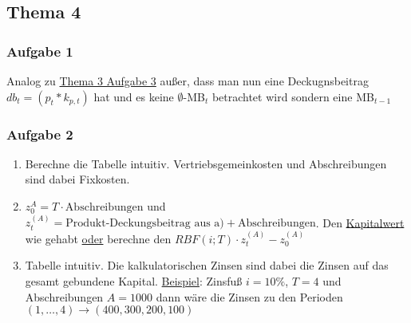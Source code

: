 \documentclass[12pt]{article}
\begin{document}
		\subsection*{Thema 4}
		\subsubsection*{Aufgabe 1}
		Analog zu \hyperref[Thema3Aufgabe3]{Thema 3 Aufgabe 3} außer, dass man nun eine Deckugnsbeitrag $db_t=(p_t*k_{p,t})$ hat und es keine $\emptyset$-MB$_t$ betrachtet wird sondern eine MB$_{t-1}$
		
		\subsubsection*{Aufgabe 2}
		\begin{enumerate}[label=\alph*)]
			\item Berechne die Tabelle intuitiv. Vertriebsgemeinkosten und Abschreibungen sind dabei Fixkosten.
			\item $z_0^{A}=T\cdot \text{Abschreibungen}$ und $z_t^{(A)}=\text{Produkt-Deckungsbeitrag aus a)} + \text{Abschreibungen}$. Den \hyperref[Kapitalwert]{Kapitalwert} wie gehabt \underline{oder} berechne den $RBF(i;T) \cdot z_t^{(A)}- z_0^{(A)}$
			\item Tabelle intuitiv. Die kalkulatorischen Zinsen sind dabei die Zinsen auf das gesamt gebundene Kapital. \underline{Beispiel}: Zinsfuß $i=10\%$, $T=4$ und Abschreibungen $A = 1000$ dann wäre die Zinsen zu den Perioden $(1,\dots,4) \rightarrow (400, 300, 200 , 100)$
		\end{enumerate}
\end{document}
